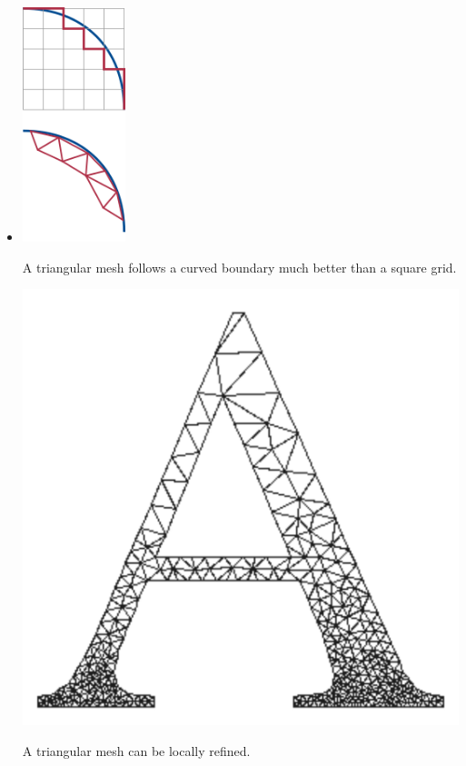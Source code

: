 \begin{itemize}
\item

\begin{marginfigure}
\centering
\includegraphics[width=3cm]{numeric/figures/staircase}
\caption{A triangular mesh follows a curved boundary much better than a square grid.}
\label{fig-staircasing}
\end{marginfigure}

\begin{marginfigure}
\centering
\includegraphics[scale=0.5]{numeric/figures/grid}
\caption{A triangular mesh can be locally refined.}
\label{fig-grid}
\end{marginfigure}




\end{itemize}
